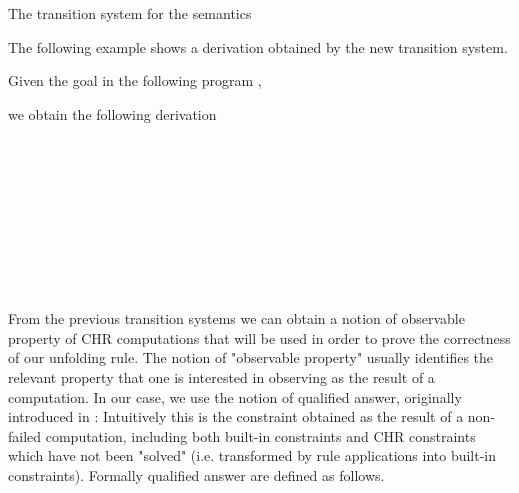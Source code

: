 \documentclass{tlp}
\begin{document}
\begin{table*}[t]
\caption{The transition system  for the  semantics}
\centering
\label{tab:operational-semantics}

\end{table*}

The following example shows a derivation obtained by the new transition
system.

\begin{example}\label{chiara1}
Given the goal  in the following program ,
\begin{small}

\end{small}
\vspace*{0.2cm}
we obtain the following derivation \\
\begin{small}

\vspace*{0.2cm}\\

\vspace*{0.2cm}\\

\vspace*{0.2cm}\\

\vspace*{0.2cm}\\

\vspace*{0.2cm}\\

\vspace*{0.2cm}\\

\vspace*{0.2cm}\\

\vspace*{0.2cm}\\

\end{small}
\end{example}

From the previous transition systems we can obtain a notion
of observable property of CHR computations that will be used in order
to prove the correctness of our unfolding rule.
The notion of "observable property" usually identifies the relevant property that one is interested in
observing as the result of a computation. In our case, we use the notion of qualified answer,
originally introduced in \cite{Fru98}: Intuitively this is the constraint obtained as the result of a non-failed computation,
including both built-in constraints and CHR constraints which have not been "solved" (i.e. transformed
by rule applications into built-in constraints).
Formally qualified answer are defined as follows.
\end{document}
